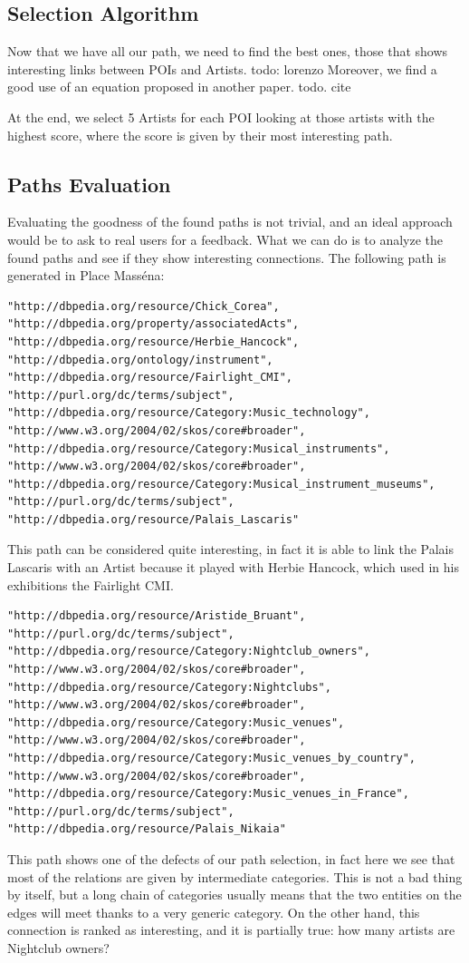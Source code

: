 \documentclass[paper=a4, fontsize=11pt]{scrartcl}
\begin{document}
\subsection{Selection Algorithm}
Now that we have all our path, we need to find the best ones, those that shows interesting links between POIs and Artists.
todo: lorenzo
Moreover, we find a good use of an equation proposed in another paper. todo. cite

At the end, we select 5 Artists for each POI looking at those artists with the highest score, where the score is given by their most interesting path.

\subsection{Paths Evaluation}
Evaluating the goodness of the found paths is not trivial, and an ideal approach would be to ask to real users for a feedback.
What we can do is to analyze the found paths and see if they show interesting connections.
The following path is generated in Place Masséna:
\begin{lstlisting}
"http://dbpedia.org/resource/Chick_Corea", 
"http://dbpedia.org/property/associatedActs", 
"http://dbpedia.org/resource/Herbie_Hancock", 
"http://dbpedia.org/ontology/instrument", 
"http://dbpedia.org/resource/Fairlight_CMI", 
"http://purl.org/dc/terms/subject", 
"http://dbpedia.org/resource/Category:Music_technology", 
"http://www.w3.org/2004/02/skos/core#broader", 
"http://dbpedia.org/resource/Category:Musical_instruments", 
"http://www.w3.org/2004/02/skos/core#broader",       
"http://dbpedia.org/resource/Category:Musical_instrument_museums", 
"http://purl.org/dc/terms/subject", 
"http://dbpedia.org/resource/Palais_Lascaris"
\end{lstlisting}
This path can be considered quite interesting, in fact it is able to link the Palais Lascaris with an Artist because it played with Herbie Hancock, which used in his exhibitions the Fairlight CMI.
\begin{lstlisting}
"http://dbpedia.org/resource/Aristide_Bruant", 
"http://purl.org/dc/terms/subject", 
"http://dbpedia.org/resource/Category:Nightclub_owners", 
"http://www.w3.org/2004/02/skos/core#broader", 
"http://dbpedia.org/resource/Category:Nightclubs", 
"http://www.w3.org/2004/02/skos/core#broader", 
"http://dbpedia.org/resource/Category:Music_venues", 
"http://www.w3.org/2004/02/skos/core#broader", 
"http://dbpedia.org/resource/Category:Music_venues_by_country", 
"http://www.w3.org/2004/02/skos/core#broader", 
"http://dbpedia.org/resource/Category:Music_venues_in_France", 
"http://purl.org/dc/terms/subject", 
"http://dbpedia.org/resource/Palais_Nikaia"
\end{lstlisting}
This path shows one of the defects of our path selection, in fact here we see that most of the relations are given by intermediate categories. This is not a bad thing by itself, but a long chain of categories usually means that the two entities on the edges will meet thanks to a very generic category. On the other hand, this connection is ranked as interesting, and it is partially true: how many artists are Nightclub owners?
\end{document}
